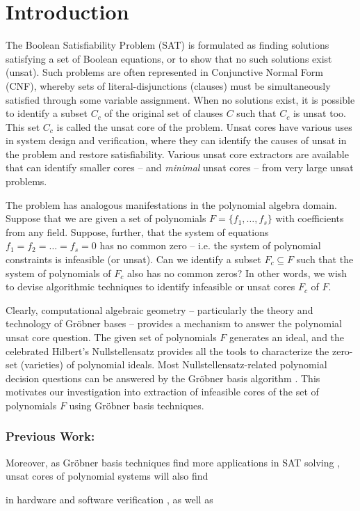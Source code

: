 \section{Introduction}

The Boolean Satisfiability Problem (SAT) is formulated as finding
solutions satisfying a set of Boolean equations, or to show that no
such solutions exist (unsat). Such problems are often represented in
Conjunctive Normal Form (CNF), whereby sets of literal-disjunctions
(clauses) must be simultaneously satisfied through some variable
assignment. When no solutions exist, it is possible to identify a
subset $C_c$ of the original set of clauses $C$ such that $C_c$ is
unsat too. This set $C_c$ is called the unsat core of the
problem. Unsat cores have various uses in system design and
verification, where they can identify the causes of unsat in the
problem and restore satisfiability. Various unsat core extractors are
available \cite{Haifa2014} \cite{Joao2012} that can identify smaller
cores -- and {\it minimal} unsat cores -- from very large unsat
problems.  

The problem has analogous manifestations in the polynomial algebra
domain. Suppose that we are given a set of polynomials $F =
\{f_1,\dots,f_s\}$ with coefficients from any field. Suppose, further,
that the system of equations $f_1 = f_2 = \dots = f_s = 0$ has no
common zero -- i.e. the system of polynomial constraints is infeasible
(or unsat). Can we identify a subset $F_c \subseteq F$ such that the
system of polynomials of $F_c$ also has no common
zeros? In other words, we wish to devise algorithmic techniques to
identify infeasible or unsat cores $F_c$ of $F$. 

Clearly, computational algebraic geometry -- particularly the theory
and technology of Gr\"obner bases -- provides a mechanism to answer
the polynomial unsat core question. The given set of polynomials $F$
generates an ideal, and the celebrated Hilbert's Nullstellensatz
\cite{ideals:book} provides all the tools to characterize the zero-set
(varieties) of polynomial ideals. Most Nullstellensatz-related
polynomial decision questions can be answered by the Gr\"obner basis
algorithm \cite{gb_book}. This motivates our investigation into
extraction of infeasible cores of the set of polynomials $F$ using
Gr\"obner basis techniques.



\subsubsection{Previous Work:} 


Moreover, as Gr\"obner basis techniques
find more applications in SAT solving \cite{CEI:stoc-96} \cite{condrat-tacas07}
\cite{zengler:GB-SAT}, unsat cores of polynomial systems will also find


in hardware and software verification
\cite{lv:tcad2013}, as well as 


